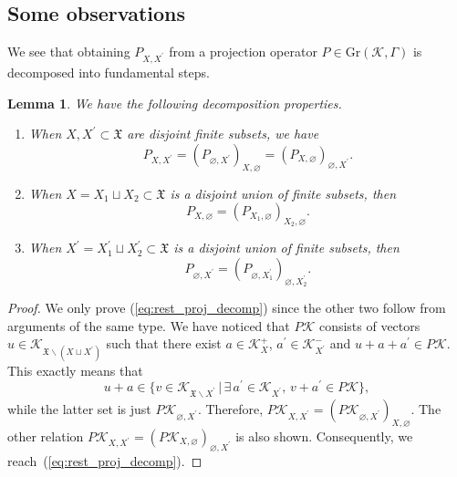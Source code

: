 \documentclass[11pt]{article}
\numberwithin{equation}{section}
\numberwithin{equation}{section}
\newtheorem{Lemma}[Theorem]{Lemma}
\newcommand{\pr}[1]{#1^{\prime}}
\newcommand{\mfrak}[1]{\mathfrak{#1}}
\newcommand{\mcal}[1]{\mathcal{#1}}
\newcommand{\mrm}[1]{\mathrm{#1}}
\begin{document}
\subsection{Some observations}
We see that obtaining $P_{X,\pr{X}}$ from a projection operator $P\in\mrm{Gr}(\mcal{K},\Gamma)$ is decomposed into fundamental steps.
\begin{Lemma}
\label{lem:rest_decomp} We have the following decomposition properties.
\begin{enumerate}\itemsep=0pt
\item[$1.$] 	When $X, \pr{X}\subset\mfrak{X}$ are disjoint finite subsets, we have
		\begin{equation}		\label{eq:rest_proj_decomp}
			P_{X,\pr{X}}=(P_{\varnothing,\pr{X}})_{X,\varnothing}=(P_{X,\varnothing})_{\varnothing, \pr{X}}.
		\end{equation}
\item[$2.$] 	When $X=X_{1}\sqcup X_{2}\subset \mfrak{X}$ is a disjoint union of finite subsets, then
		\begin{equation*}
			P_{X,\varnothing}=(P_{X_{1},\varnothing})_{X_{2},\varnothing}.
		\end{equation*}
\item[$3.$] 	When $\pr{X}=\pr{X}_{1}\sqcup \pr{X}_{2}\subset\mfrak{X}$ is a disjoint union of finite subsets, then
		\begin{equation*}
			P_{\varnothing,\pr{X}}=(P_{\varnothing,\pr{X}_{1}})_{\varnothing,\pr{X}_{2}}.
		\end{equation*}
\end{enumerate}
\end{Lemma}
\begin{proof}We only prove (\ref{eq:rest_proj_decomp}) since the other two follow from arguments of the same type.
We have noticed that $P\mcal{K}$ consists of vectors $u\in \mcal{K}_{\mfrak{X}\backslash (X\sqcup\pr{X})}$ such that there exist $a\in \mcal{K}_{X}^{+}$, $\pr{a}\in \mcal{K}_{\pr{X}}^{-}$ and $u+a+\pr{a}\in P\mcal{K}$. This exactly means that
\begin{equation*}
	u+a\in \{v\in \mcal{K}_{\mfrak{X}\backslash \pr{X}}\,|\, \exists\, \pr{a}\in \mcal{K}_{\pr{X}},\, v+\pr{a}\in P\mcal{K}\},
\end{equation*}
while the latter set is just $P\mcal{K}_{\varnothing,\pr{X}}$. Therefore, $P\mcal{K}_{X,\pr{X}}=(P\mcal{K}_{\varnothing,\pr{X}})_{X,\varnothing}$. The other relation $P\mcal{K}_{X,\pr{X}}=(P\mcal{K}_{X,\varnothing})_{\varnothing,\pr{X}}$ is also shown. Consequently, we reach~(\ref{eq:rest_proj_decomp}).
\end{proof}
\end{document}
